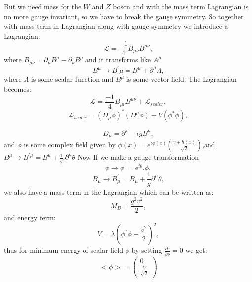 But we need mass for the $W$ and $Z$ boson and with the mass term Lagrangian is no more gauge invariant, so we have to break the gauge symmetry. So together with mass term in Lagrangian along with gauge symmetry we introduce a Lagrangian:
\begin{equation}
\mathcal{L}=\frac{-1}{4}B_{\mu\nu}B^{\mu\nu},
\end{equation}
where $B_{\mu\nu}=\partial_{\mu}B^{\mu}-\partial_{\nu}B^{\mu}$ and it transforms like $A^{\mu}$
\begin{equation}
B^{\mu}\rightarrow B^{\prime}{\mu}=B^{\mu}+\partial^{\mu}\Lambda,
\end{equation}
where $\Lambda$ is some scalar function and $B^{\mu}$ is some vector field. The Lagrangian becomes:
\begin{equation}
\mathcal{L}=\frac{-1}{4}B_{\mu\nu}B^{\mu\nu}+\mathcal{L}_{scaler},
\end{equation}
\begin{equation}
\mathcal{L}_{scaler}=(D_{\mu}\phi)^{*}(D^{\mu}\phi)-V(\phi^{*}\phi),
\end{equation}

\begin{equation}
D_{\mu}=\partial^{\mu}-\iota gB^{\mu},
\end{equation}
and $\phi$ is some complex field given by $\phi(x)=e^{\iota\phi(x)}(\frac{v+h(x)}{\sqrt{2}})$,and $B^{\mu}\rightarrow B^{\prime\mu}=B^{\mu}+\frac{1}{g}.\partial^{\mu}\theta$ Now  If we make a gauge transformation
\begin{equation}
\phi\rightarrow\phi^{\prime}=e^{i\theta}.\phi,
\end{equation}
\begin{equation}
B_{\mu}\rightarrow B_{\mu}^{\prime}=B_{\mu}+\frac{1}{g}\partial^{\mu}\theta,
\end{equation}
we also have a mass term in the Lagrangian which can be written as:
\begin{equation}
M_{B}=\frac{g^{2}v^{2}}{2},
\end{equation}
and energy term:
\begin{equation}
V=\lambda(\phi^{*}\phi-\frac{v^{2}}{2})^{2},
\end{equation}
thus for minimum energy of scalar field $\phi$ by setting $\frac{\partial v}{\partial \phi}=0$ we get:
\begin{equation}
<\phi>=\begin{pmatrix}
0\\
\frac{V}{\sqrt{2}}
\end{pmatrix}
\end{equation}


